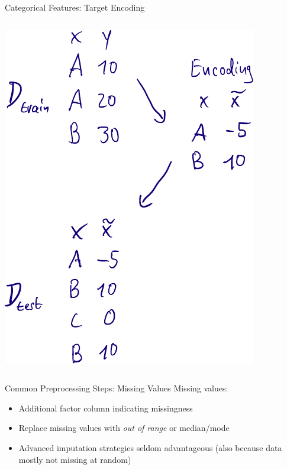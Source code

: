 \begin{frame}{Categorical Features: Target Encoding}
\begin{columns}
\begin{column}{0.3\textwidth}
\begin{center}
        \includegraphics[width = \textwidth]{images/scetch_impact_encoding.pdf}
      \end{center}
    \end{column}
  \end{columns}
\end{frame}

\begin{frame}{Common Preprocessing Steps: Missing Values}
  Missing values:
  \begin{itemize}
    \item Additional factor column indicating missingness
    \item Replace missing values with \emph{out of range} or median/mode
    \item Advanced imputation strategies seldom advantageous (also because data mostly not missing at random)
  \end{itemize}
\end{frame}

